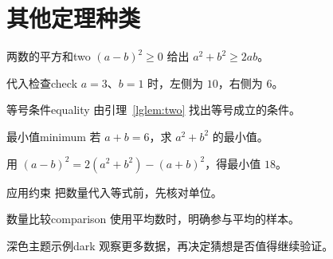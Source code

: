 \documentclass[UTF8,fontset=fandol,12pt,oneside]{ctexbook}
\begin{document}
\section*{其他定理种类}
\begin{lglemma}{两数的平方和}{two}
$(a-b)^2\ge0$ 给出 $a^2+b^2\ge 2ab$。
\end{lglemma}
\begin{lgexample}{代入检查}{check}
$a=3$、$b=1$ 时，左侧为 $10$，右侧为 $6$。
\end{lgexample}
\begin{lgexercise}{等号条件}{equality}
由引理~\ref{lglem:two} 找出等号成立的条件。
\end{lgexercise}
\begin{lgproblem}{最小值}{minimum}
若 $a+b=6$，求 $a^2+b^2$ 的最小值。
\end{lgproblem}
\begin{lgsolution}
用 $(a-b)^2=2(a^2+b^2)-(a+b)^2$，得最小值 $18$。
\end{lgsolution}
\begin{lgremark*}{应用约束}
把数量代入等式前，先核对单位。
\end{lgremark*}
\begin{lgapplication}{数量比较}{comparison}
使用平均数时，明确参与平均的样本。
\end{lgapplication}
\begin{lgconjecture}[lg theme=dark]{深色主题示例}{dark}
观察更多数据，再决定猜想是否值得继续验证。
\end{lgconjecture}
\end{document}
